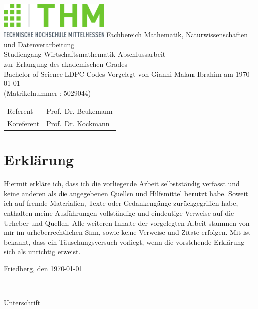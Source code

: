 \documentclass[10pt]{report}
\begin{document}

\begin{titlepage}
\begin{center} 
\vfill
\includegraphics[width=0.4\textwidth]{./pic/Logo_THM}
\vfill
Fachbereich Mathematik, Naturwissenschaften und Datenverarbeitung\\
Studiengang Wirtschaftsmathematik
\vfill
{\LARGE Abschlussarbeit} \\[0.5cm]
{\large zur Erlangung des akademischen Grades} \\[0.5cm]
{\large Bachelor of Science}
\vfill
{\Huge LDPC-Codes}
\vfill
Vorgelegt von Gianni Malam Ibrahim am \today\\[0.1cm] (Matrikelnummer : 5029044)
\vfill
\begin{tabular}{ll}
Referent     & Prof.\ Dr. Beukemann \\
Koreferent   & Prof.\ Dr. Kockmann
\end{tabular}
\vfill
\end{center}
\end{titlepage}


\section*{Erkl\"arung}
\thispagestyle{empty}

Hiermit erkl{\"a}re ich, dass ich die vorliegende Arbeit selbstst{\"a}ndig verfasst und keine anderen als die angegebenen Quellen und Hilfsmittel benutzt habe. Soweit ich auf fremde Materialien, Texte oder Gedankeng{\"a}nge zur{\"u}ckgegriffen habe, enthalten meine Ausf{\"u}hrungen vollst{\"a}ndige und eindeutige Verweise auf die Urheber und Quellen. Alle weiteren Inhalte der vorgelegten Arbeit stammen von mir im urheberrechtlichen Sinn, sowie keine Verweise und Zitate erfolgen. Mit ist bekannt, dass ein T{\"a}uschungsversuch vorliegt, wenn die vorstehende Erkl{\"a}rung sich als unrichtig erweist.\\[1.5cm]
\parbox{0.5\textwidth}{Friedberg, den \today}%
\parbox{0.5\textwidth}{
\begin{center}
\rule{0.5\textwidth}{0.5pt}\\
Unterschrift
\end{center}
}
\end{document}
